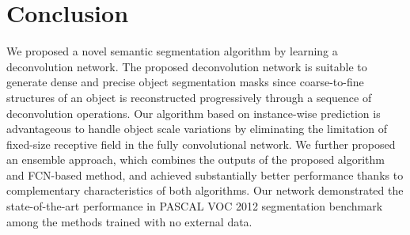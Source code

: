 \documentclass[10pt,twocolumn,letterpaper]{article}
\begin{document}
\section{Conclusion}
We proposed a novel semantic segmentation algorithm by learning a deconvolution network.
The proposed deconvolution network is suitable to generate dense and precise object segmentation masks since coarse-to-fine structures of an object is reconstructed progressively through a sequence of deconvolution operations.
Our algorithm based on instance-wise prediction is advantageous to handle object scale variations by eliminating the limitation of fixed-size receptive field in the fully convolutional network.
We further proposed an ensemble approach, which combines the outputs of the proposed algorithm and FCN-based method, and achieved substantially better performance thanks to complementary characteristics of both algorithms.
Our network demonstrated the state-of-the-art performance in PASCAL VOC 2012 segmentation benchmark among the methods trained with no external data.

\newpage

{\small


}
\end{document}
